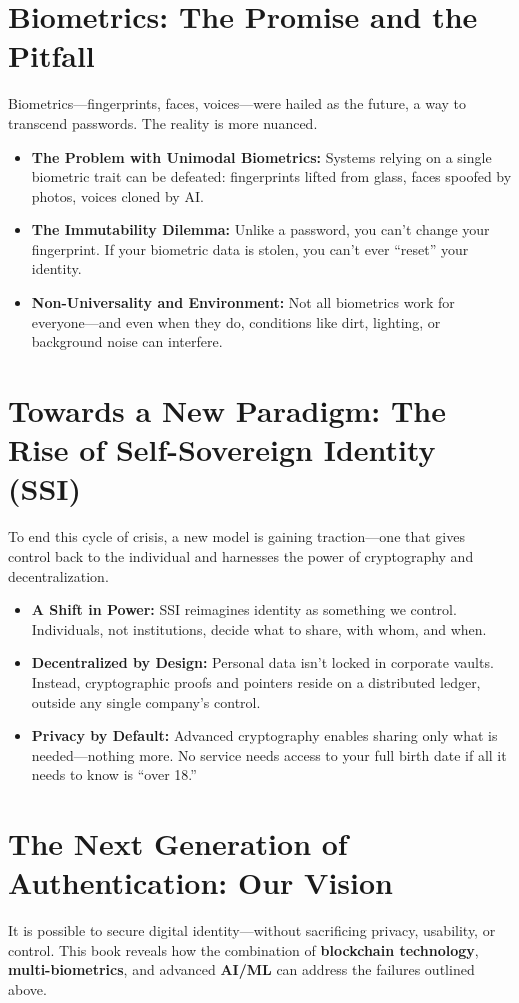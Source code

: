 \section{Biometrics: The Promise and the Pitfall}
Biometrics—fingerprints, faces, voices—were hailed as the future, a way to transcend passwords. The reality is more nuanced.

\begin{itemize}
    \item \textbf{The Problem with Unimodal Biometrics:} Systems relying on a single biometric trait can be defeated: fingerprints lifted from glass, faces spoofed by photos, voices cloned by AI.
    \item \textbf{The Immutability Dilemma:} Unlike a password, you can’t change your fingerprint. If your biometric data is stolen, you can’t ever “reset” your identity.
    \item \textbf{Non-Universality and Environment:} Not all biometrics work for everyone—and even when they do, conditions like dirt, lighting, or background noise can interfere.
\end{itemize}

\section{Towards a New Paradigm: The Rise of Self-Sovereign Identity (SSI)}
To end this cycle of crisis, a new model is gaining traction—one that gives control back to the individual and harnesses the power of cryptography and decentralization.

\begin{itemize}
    \item \textbf{A Shift in Power:} SSI reimagines identity as something we control. Individuals, not institutions, decide what to share, with whom, and when.
    \item \textbf{Decentralized by Design:} Personal data isn’t locked in corporate vaults. Instead, cryptographic proofs and pointers reside on a distributed ledger, outside any single company’s control.
    \item \textbf{Privacy by Default:} Advanced cryptography enables sharing only what is needed—nothing more. No service needs access to your full birth date if all it needs to know is “over 18.”
\end{itemize}

\section{The Next Generation of Authentication: Our Vision}
It is possible to secure digital identity—without sacrificing privacy, usability, or control. This book reveals how the combination of \textbf{blockchain technology}, \textbf{multi-biometrics}, and advanced \textbf{AI/ML} can address the failures outlined above.

